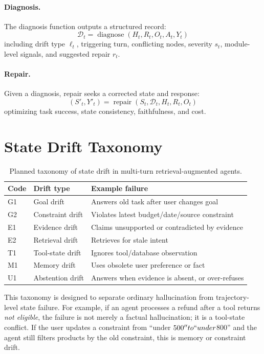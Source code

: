\documentclass[letterpaper]{article}
\begin{document}
\paragraph{Diagnosis.}
The diagnosis function outputs a structured record:
\begin{equation}
\mathcal{D}_t = \operatorname{diagnose}(H_t,R_t,O_t,A_t,Y_t)
\end{equation}
including drift type $\ell_t$, triggering turn, conflicting nodes, severity $s_t$, module-level signals, and suggested repair $r_t$.

\paragraph{Repair.}
Given a diagnosis, repair seeks a corrected state and response:
\begin{equation}
(S'_t,Y'_t) = \operatorname{repair}(S_t,\mathcal{D}_t,H_t,R_t,O_t)
\end{equation}
optimizing task success, state consistency, faithfulness, and cost.

\section{State Drift Taxonomy}

\begin{table}[t]
\centering
\small
\begin{tabular}{lll}
\toprule
Code & Drift type & Example failure \\
\midrule
G1 & Goal drift & Answers old task after user changes goal \\
G2 & Constraint drift & Violates latest budget/date/source constraint \\
E1 & Evidence drift & Claims unsupported or contradicted by evidence \\
E2 & Retrieval drift & Retrieves for stale intent \\
T1 & Tool-state drift & Ignores tool/database observation \\
M1 & Memory drift & Uses obsolete user preference or fact \\
U1 & Abstention drift & Answers when evidence is absent, or over-refuses \\
\bottomrule
\end{tabular}
\caption{Planned taxonomy of state drift in multi-turn retrieval-augmented agents.}
\end{table}

This taxonomy is designed to separate ordinary hallucination from trajectory-level state failure. For example, if an agent processes a refund after a tool returns \emph{not eligible}, the failure is not merely a factual hallucination; it is a tool-state conflict. If the user updates a constraint from ``under $500'' to ``under $800'' and the agent still filters products by the old constraint, this is memory or constraint drift.
\end{document}
